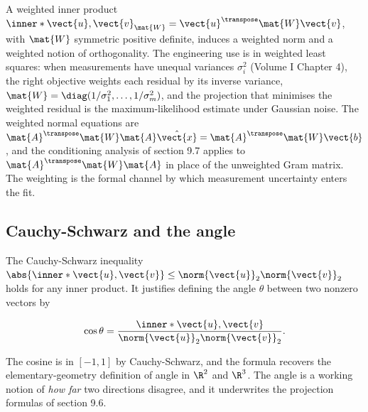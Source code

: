 \begin{mastery}
A weighted inner product $\inner*{\vect{u}, \vect{v}}_{\mat{W}} =
\vect{u}^{\transpose}\mat{W}\vect{v}$, with $\mat{W}$ symmetric
positive definite, induces a weighted norm and a weighted notion of
orthogonality. The engineering use is in weighted least squares: when
measurements have unequal variances $\sigma_{i}^{2}$ (Volume I
Chapter 4), the right objective weights each residual by its inverse
variance, $\mat{W} = \diag(1/\sigma_{1}^{2}, \ldots, 1/\sigma_{m}^{2})$,
and the projection that minimises the weighted residual is the
maximum-likelihood estimate under Gaussian noise. The weighted
normal equations are $\mat{A}^{\transpose}\mat{W}\mat{A}\hat{\vect{x}}
= \mat{A}^{\transpose}\mat{W}\vect{b}$, and the conditioning analysis
of section 9.7 applies to $\mat{A}^{\transpose}\mat{W}\mat{A}$ in
place of the unweighted Gram matrix. The weighting is the formal
channel by which measurement uncertainty enters the fit.
\end{mastery}

\subsection{Cauchy-Schwarz and the angle}

The Cauchy-Schwarz inequality $\abs{\inner*{\vect{u}, \vect{v}}}
\leq \norm{\vect{u}}_{2} \norm{\vect{v}}_{2}$ holds for any inner
product. It justifies defining the angle $\theta$ between two
nonzero vectors by

\[
\cos \theta = \frac{\inner*{\vect{u}, \vect{v}}}
{\norm{\vect{u}}_{2} \norm{\vect{v}}_{2}}.
\]

The cosine is in $[-1, 1]$ by Cauchy-Schwarz, and the formula
recovers the elementary-geometry definition of angle in $\R^{2}$
and $\R^{3}$. The angle is a working notion of \emph{how far} two
directions disagree, and it underwrites the projection formulas of
section 9.6.

